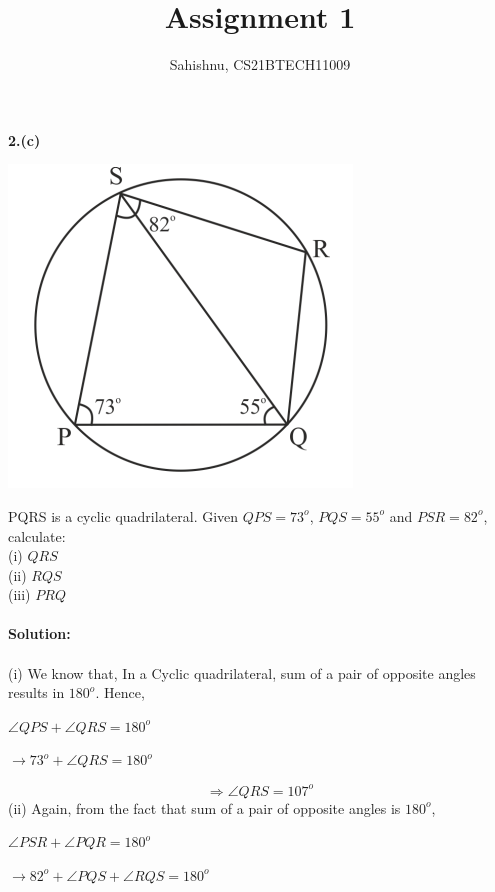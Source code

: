 \documentclass[8pt, twocolumn]{article}
\title{Assignment 1}
\author{Sahishnu, CS21BTECH11009}
\date{}
\begin{document}
\maketitle
\textbf {2.(c)}\\
\begin{center}
\includegraphics[scale=0.5]{figs/fig1.png}

\end{center}
PQRS is a cyclic quadrilateral. Given \angle $QPS=73^o$, \angle $PQS=55^o$ and \angle $PSR=82^o$, calculate:\\
(i) \angle $QRS$\\
(ii) \angle $RQS$\\
(iii) \angle $PRQ$\\\\
\textbf {Solution: }\\\\
(i) We know that, In a Cyclic quadrilateral, sum of a pair of opposite angles results in $180^o$.
Hence,
\begin{center}
   $\angle QPS + \angle QRS = 180^o$
\end{center}
\begin{center}
$\rightarrow 73^o + \angle QRS = 180^o$
\end{center}
\begin{equation}
    \Rightarrow \angle QRS = 107^o
\end{equation}
(ii) Again, from the fact that sum of a pair of opposite angles is $180^o$,
\begin{center}
    $\angle PSR + \angle PQR = 180^o$
\end{center}
\begin{center}
    $\rightarrow 82^o + \angle PQS + \angle RQS = 180^o $
\end{center}
\end{document}
